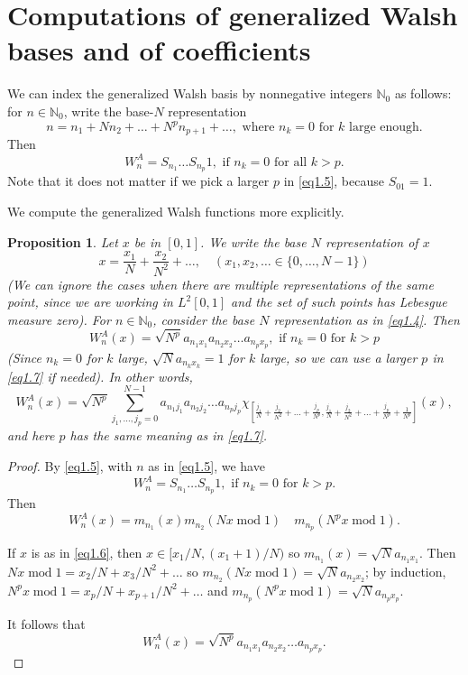 \documentclass[11pt]{amsart}
\newtheorem{proposition}[theorem]{Proposition}
\theoremstyle{definition}
\theoremstyle{remark}
\numberwithin{equation}{section}
\newcommand{\bn}{\mathbb{N}}
\renewcommand{\mod}{\operatorname{mod}}
\begin{document}
\section{Computations of generalized Walsh bases and of coefficients}\label{s3}
We can index the generalized Walsh basis by nonnegative integers $\bn_0$ as follows: for $n\in\bn_0$, write the base-$N$ representation
\begin{equation}
n=n_1+Nn_2+\dots+N^pn_{p+1}+\dots, \mbox{ where $n_k=0$ for $k$ large enough.}
\label{eq1.4}
\end{equation}
Then
\begin{equation}
W_n^A=S_{n_1}\dots S_{n_p}1,\mbox{ if $n_k=0$ for all $k>p$.}
\label{eq1.5}
\end{equation}
Note that it does not matter if we pick a larger $p$ in \eqref{eq1.5}, because $S_01=1$.


We compute the generalized Walsh functions more explicitly.
\begin{proposition}\label{pr1.2}
Let $x$ be in $[0,1]$. We write the base $N$ representation of $x$
\begin{equation}
x=\frac{x_1}{N}+\frac{x_2}{N^2}+\dots,\quad (x_1,x_2,\dots\in\{0,\dots,N-1\})
\label{eq1.6}
\end{equation}
(We can ignore the cases when there are multiple representations of the same point, since we are working in $L^2[0,1]$ and the set of such points has Lebesgue measure zero).
For $n\in\bn_0$, consider the base $N$ representation as in \eqref{eq1.4}. Then
\begin{equation}
W_n^A(x)=\sqrt{N^p}a_{n_1x_1}a_{n_2x_2}\dots a_{n_px_p}, \mbox{ if $n_k=0$ for $k>p$}
\label{eq1.7}
\end{equation}
(Since $n_k=0$ for $k$ large, $\sqrt{N}a_{n_kx_k}=1$ for $k$ large, so we can use a larger $p$ in \eqref{eq1.7} if needed).
In other words,
\begin{equation}
W_n^A(x)=\sqrt{N^p}\sum_{j_1,\dots,j_p=0}^{N-1}a_{n_1 j_1}a_{n_2j_2}\dots a_{n_pj_p}\chi_{\left[\frac{j_1}{N}+\frac{j_2}{N^2}+\dots+\frac{j_p}{N^p},\frac{j_1}{N}+\frac{j_2}{N^2}+\dots+\frac{j_p}{N^p}+\frac{1}{N^p}\right]}(x),
\label{eq1.8}
\end{equation}
and here $p$ has the same meaning as in \eqref{eq1.7}.
\end{proposition}

\begin{proof}
By \eqref{eq1.5}, with $n$ as in \eqref{eq1.5}, we have
$$W_n^A=S_{n_1}\dots S_{n_p}1,\mbox{ if $n_k=0$ for $k>p$}.$$
Then $$W_n^A(x)=m_{n_1}(x)m_{n_2}(Nx\mod1)\quad m_{n_p}(N^px\mod1).$$


If $x$ is as in \eqref{eq1.6}, then $x\in[{x_1}/N,(x_1+1)/N)$ so $m_{n_1}(x)=\sqrt{N}a_{n_1x_1}$. Then $Nx\mod1= x_2/N+x_3/N^2+\dots$ so $m_{n_2}(Nx\mod1)=\sqrt{N}a_{n_2x_2}$; by induction, $N^px\mod 1=x_p/N+x_{p+1}/N^2+\dots$ and  $m_{n_p}(N^px\mod1)=\sqrt{N} a_{n_px_p}$.

It follows that
$$W_n^A(x)=\sqrt{N^p}a_{n_1x_1}a_{n_2x_2}\dots a_{n_px_p}.$$

\end{proof}
\end{document}

